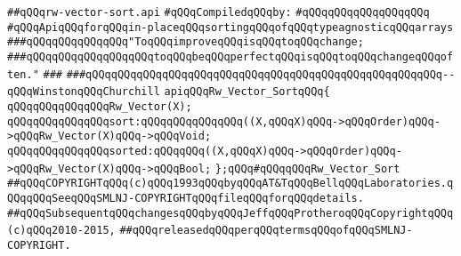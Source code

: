 \label{src/lib/src/rw-vector-sort.api}
\verb|##qQQqrw-vector-sort.api|\newline
\newline
\verb|#qQQqCompiledqQQqby:|\newline
\verb|#qQQqqQQqqQQqqQQqqQQq|\newline
\newline
\newline
\newline
\verb|#qQQqApiqQQqforqQQqin-placeqQQqsortingqQQqofqQQqtypeagnosticqQQqarrays|\newline
\newline
\newline
\verb|###qQQqqQQqqQQqqQQq"ToqQQqimproveqQQqisqQQqtoqQQqchange;|\newline
\verb|###qQQqqQQqqQQqqQQqqQQqtoqQQqbeqQQqperfectqQQqisqQQqtoqQQqchangeqQQqoften."|\newline
\verb|###|\newline
\verb|###qQQqqQQqqQQqqQQqqQQqqQQqqQQqqQQqqQQqqQQqqQQqqQQqqQQqqQQq--qQQqWinstonqQQqChurchill|\newline
\newline
\newline
\newline
\verb|apiqQQqRw_Vector_SortqQQq{|\newline
\newline
\verb|qQQqqQQqqQQqqQQqRw_Vector(X);|\newline
\newline
\verb|qQQqqQQqqQQqqQQqsort:qQQqqQQqqQQqqQQq((X,qQQqX)qQQq->qQQqOrder)qQQq->qQQqRw_Vector(X)qQQq->qQQqVoid;|\newline
\verb|qQQqqQQqqQQqqQQqsorted:qQQqqQQq((X,qQQqX)qQQq->qQQqOrder)qQQq->qQQqRw_Vector(X)qQQq->qQQqBool;|\newline
\newline
\verb|};qQQq#qQQqqQQqRw_Vector_Sort|\newline
\newline
\newline
\newline
\verb|##qQQqCOPYRIGHTqQQq(c)qQQq1993qQQqbyqQQqAT&TqQQqBellqQQqLaboratories.qQQqqQQqSeeqQQqSMLNJ-COPYRIGHTqQQqfileqQQqforqQQqdetails.|\newline
\verb|##qQQqSubsequentqQQqchangesqQQqbyqQQqJeffqQQqProtheroqQQqCopyrightqQQq(c)qQQq2010-2015,|\newline
\verb|##qQQqreleasedqQQqperqQQqtermsqQQqofqQQqSMLNJ-COPYRIGHT.|\newline

